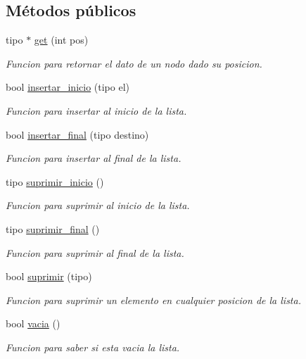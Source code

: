 \subsection*{Métodos públicos}
\begin{DoxyCompactItemize}
\item 
tipo $\ast$ \hyperlink{classLista_ada89d0bebdb2db83b7c19c940ab70e62}{get} (int pos)
\begin{DoxyCompactList}\small\item\em Funcion para retornar el dato de un nodo dado su posicion. \end{DoxyCompactList}\item 
bool \hyperlink{classLista_a4b6c7156fcd7ca69d5b12bcbb3312590}{insertar\+\_\+inicio} (tipo el)
\begin{DoxyCompactList}\small\item\em Funcion para insertar al inicio de la lista. \end{DoxyCompactList}\item 
bool \hyperlink{classLista_a4ff75a84824729ce5af9d9f5d184020a}{insertar\+\_\+final} (tipo destino)
\begin{DoxyCompactList}\small\item\em Funcion para insertar al final de la lista. \end{DoxyCompactList}\item 
tipo \hyperlink{classLista_aa945bc96acdaeaefb3b9180f05539142}{suprimir\+\_\+inicio} ()
\begin{DoxyCompactList}\small\item\em Funcion para suprimir al inicio de la lista. \end{DoxyCompactList}\item 
tipo \hyperlink{classLista_aa23f3bd8ec8de6a913cc9cd876ef82b6}{suprimir\+\_\+final} ()
\begin{DoxyCompactList}\small\item\em Funcion para suprimir al final de la lista. \end{DoxyCompactList}\item 
bool \hyperlink{classLista_a846073e6ce175fa96c6322a4870ddc6d}{suprimir} (tipo)
\begin{DoxyCompactList}\small\item\em Funcion para suprimir un elemento en cualquier posicion de la lista. \end{DoxyCompactList}\item 
bool \hyperlink{classLista_a92650be08dd29c9800da07c65ad6ff3a}{vacia} ()
\begin{DoxyCompactList}\small\item\em Funcion para saber si esta vacia la lista. \end{DoxyCompactList}\item 

\end{DoxyCompactItemize}
